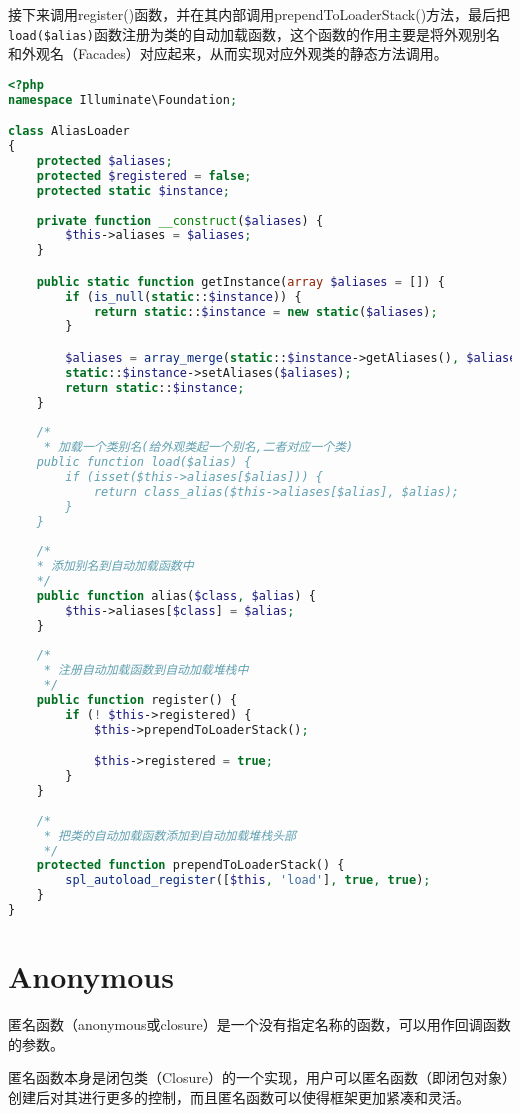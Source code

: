 接下来调用register()函数，并在其内部调用prependToLoaderStack()方法，最后把\texttt{load(\$alias)}函数注册为类的自动加载函数，这个函数的作用主要是将外观别名和外观名（Facades）对应起来，从而实现对应外观类的静态方法调用。




\begin{lstlisting}[language=PHP]
<?php
namespace Illuminate\Foundation;

class AliasLoader
{
    protected $aliases;
    protected $registered = false;
    protected static $instance;
    
    private function __construct($aliases) {
        $this->aliases = $aliases;
    }

    public static function getInstance(array $aliases = []) {
        if (is_null(static::$instance)) {
            return static::$instance = new static($aliases);
        }

        $aliases = array_merge(static::$instance->getAliases(), $aliases);
        static::$instance->setAliases($aliases);
        return static::$instance;
    }
    
    /*
     * 加载一个类别名(给外观类起一个别名,二者对应一个类)
    public function load($alias) {
        if (isset($this->aliases[$alias])) {
            return class_alias($this->aliases[$alias], $alias);
        }
    }
    
    /*
    * 添加别名到自动加载函数中
    */
    public function alias($class, $alias) {
        $this->aliases[$class] = $alias;
    }
    
    /*
     * 注册自动加载函数到自动加载堆栈中
     */
    public function register() {
        if (! $this->registered) {
            $this->prependToLoaderStack();

            $this->registered = true;
        }
    }
    
    /*
     * 把类的自动加载函数添加到自动加载堆栈头部
     */
    protected function prependToLoaderStack() {
        spl_autoload_register([$this, 'load'], true, true);
    }
}
\end{lstlisting}

\chapter{Anonymous}

匿名函数（anonymous或closure）是一个没有指定名称的函数，可以用作回调函数的参数。

匿名函数本身是闭包类（Closure）的一个实现，用户可以匿名函数（即闭包对象）创建后对其进行更多的控制，而且匿名函数可以使得框架更加紧凑和灵活。

